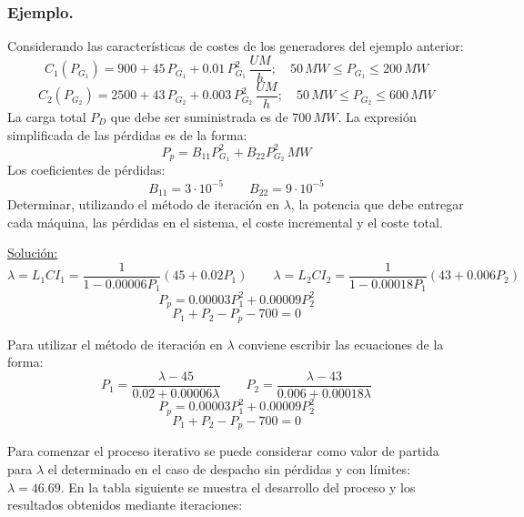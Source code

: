 				\subsubsection*{Ejemplo.}
					Considerando las características de costes de los generadores del ejemplo anterior:
					\[C_1(P_{G_1}) = 900 + 45\, P_{G_1} + 0.01\, P_{G_1}^2\,\dfrac{UM}{h}; \quad 50\,MW \leq P_{G_1} \leq 200\,MW\]
					\[C_2(P_{G_2}) = 2500 + 43\, P_{G_2} + 0.003\, P_{G_2}^2\,\dfrac{UM}{h}; \quad 50\,MW \leq P_{G_2} \leq 600\,MW\]
					La carga total $P_D$ que debe ser suministrada es de $700\,MW$. La expresión simplificada de las pérdidas es de la forma:
					\[P_p = B_{11}P_{G_1}^2 + B_{22}P_{G_2}^2\,MW\]
					Los coeficientes de pérdidas:
					\[B_{11} = 3\cdot 10^{-5} \qquad B_{22} = 9\cdot 10^{-5}\]
					Determinar, utilizando el método de iteración en $\lambda$, la potencia que debe entregar cada máquina, las pérdidas
					en el sistema, el coste incremental y el coste total.
					
					\vspace{0.25cm}
					\underline{Solución:}
					\[\lambda = L_1 CI_1 = \dfrac{1}{1-0.00006 P_1}(45 + 0.02 P_1) \qquad \lambda = L_2 CI_2 = \dfrac{1}{1-0.00018 P_1}(43 + 0.006 P_2)\]
					\[P_p = 0.00003 P_1^2 + 0.00009 P_2^2\]
					\[P_1 + P_2 - P_p - 700 = 0\]
					
					
					Para utilizar el método de iteración en $\lambda$ conviene escribir las ecuaciones de la forma:
					\[P_1 = \dfrac{\lambda - 45}{0.02 + 0.00006\lambda}\qquad P_2 = \dfrac{\lambda - 43}{0.006 + 0.00018\lambda}\]
					\[P_p = 0.00003 P_1^2 + 0.00009 P_2^2\]
					\[P_1 + P_2 - P_p - 700 = 0\]
					
					
					Para comenzar el proceso iterativo se puede considerar como valor de partida para $\lambda$ el determinado en el caso de despacho sin pérdidas y con límites: $\lambda = 46.69$. En la tabla siguiente se muestra el desarrollo del proceso y los resultados obtenidos mediante iteraciones:
					
